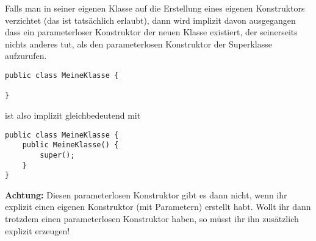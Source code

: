 Falls man in seiner eigenen Klasse auf die Erstellung eines eigenen Konstruktors 
verzichtet (das ist tatsächlich erlaubt), dann wird implizit davon ausgegangen 
dass ein parameterloser Konstruktor der neuen Klasse existiert, der seinerseits 
nichts anderes tut, als den parameterlosen Konstruktor der Superklasse aufzurufen.

\begin{lstlisting}
public class MeineKlasse {

}
\end{lstlisting}

ist also implizit gleichbedeutend mit

\begin{lstlisting}
public class MeineKlasse {
    public MeineKlasse() {
        super();
    }
}
\end{lstlisting}

\textbf{Achtung:} Diesen parameterlosen Konstruktor gibt es dann nicht, wenn ihr 
explizit einen eigenen Konstruktor (mit Parametern) erstellt habt. Wollt ihr dann 
trotzdem einen parameterlosen Konstruktor haben, so müsst ihr ihn zusätzlich 
explizit erzeugen!




